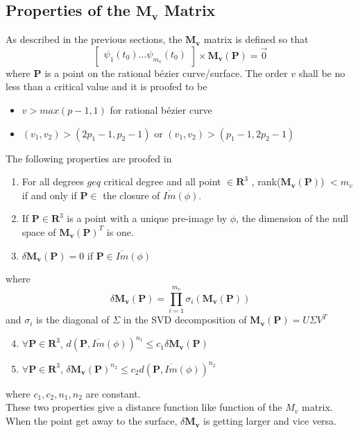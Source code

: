 \subsection{Properties of the $\mathbf{M_v}$ Matrix}
As described in the previous sections, the $\mathbf{M_v}$ matrix is defined so that
\begin{equation}
	\begin{bmatrix}
	\psi_1(t_0) \dots \psi_{m_v}(t_0)
	\end{bmatrix}
	\times
	\mathbf{M_v(\mathbf{P})}
	= \vec{0}
\end{equation}
where $\mathbf{P}$ is a point on the rational bézier curve/surface.
The order $v$ shall be no less than a critical value and it is proofed to be
\begin{itemize}
	\item $v>max(p-1,1)$ for rational bézier curve
	\item $(v_1,v_2) > (2p_1 -1, p_2 -1)$ or  $(v_1,v_2) > (p_1 -1, 2p_2 -1)$
\end{itemize}
The following properties are proofed in \citep{Laurent2014}
\begin{enumerate}
	\item For all degrees $geq$ critical degree and all point $\in\mathbf{R}^3$ , rank($\mathbf{M_v}(\mathbf{P})$) $<m_v$ if and only if $\mathbf{P}\in$ the closure of $\overline{Im}(\phi)$.
	\item If $\mathbf{P}\in\mathbf{R}^3$ is a point with a unique pre-image by $\phi$, the dimension of the null space of $\mathbf{M_v}(\mathbf{P})^T$ is one. 
	\item $\delta\mathbf{M_v}(\mathbf{P}) = 0$ if $\mathbf{P} \in\overline{Im}(\phi)$
\end{enumerate}
where 
\begin{equation}
	\delta\mathbf{M_v}(\mathbf{P}) = \prod_{i=1}^{m_v}\sigma_i(\mathbf{M_v}(\mathbf{P}))
\end{equation}
and $\sigma_i$ is the diagonal of $\Sigma$ in the SVD decomposition of $\mathbf{M_v}(\mathbf{P})=U\Sigma V^T$

\begin{enumerate}
	\setcounter{enumi}{3}
	\item $\forall\mathbf{P}\in\mathbf{R}^3$, $d(\mathbf{P},\overline{Im}(\phi))^{n_1}\leq c_1 \delta\mathbf{M_v}(\mathbf{P})$
	\item $\forall\mathbf{P}\in\mathbf{R}^3$, $\delta\mathbf{M_v}(\mathbf{P})^{n_2}\leq c_2 d(\mathbf{P},\overline{Im}(\phi))^{n_2} $
\end{enumerate}
where $c_1,c_2,n_1,n_2$ are constant.\\
These two properties give a distance function like function of the $M_v$ matrix. When the point get away to the surface, $\delta\mathbf{M_v}$ is getting larger and vice versa.
